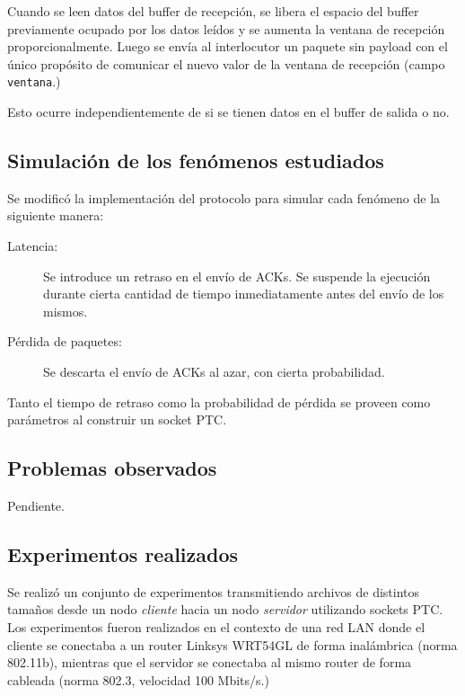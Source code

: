 \documentclass[a4paper, 10pt, twoside]{article}
\newcommand{\window}{\texttt{ventana}\xspace}
\begin{document}
Cuando se leen datos del buffer de recepción, se libera el espacio del buffer previamente ocupado por los datos leídos y se aumenta la ventana de recepción proporcionalmente. Luego se envía al interlocutor un paquete sin payload con el único propósito de comunicar el nuevo valor de la ventana de recepción (campo \window.)

Esto ocurre independientemente de si se tienen datos en el buffer de salida o no.


\subsection{Simulación de los fenómenos estudiados}
\label{sec:simulacion-fenomenos}

Se modificó la implementación del protocolo para simular cada fenómeno de la siguiente manera:

\begin{description}
  \item[Latencia:] Se introduce un retraso en el envío de ACKs. Se suspende la ejecución durante cierta cantidad de tiempo inmediatamente antes del envío de los mismos.

  \item[Pérdida de paquetes:] Se descarta el envío de ACKs al azar, con cierta probabilidad.
\end{description}

Tanto el tiempo de retraso como la probabilidad de pérdida se proveen como parámetros al construir un socket PTC.


\subsection{Problemas observados}
\label{sec:problemas-observados}

Pendiente.



\subsection{Experimentos realizados}

Se realizó un conjunto de experimentos transmitiendo archivos de distintos tamaños desde un nodo \textit{cliente} hacia un nodo \textit{servidor} utilizando sockets PTC. Los experimentos fueron realizados en el contexto de una red LAN donde el cliente se conectaba a un router Linksys WRT54GL de forma inalámbrica (norma 802.11b), mientras que el servidor se conectaba al mismo router de forma cableada (norma 802.3, velocidad 100 Mbits/s.)
\end{document}
